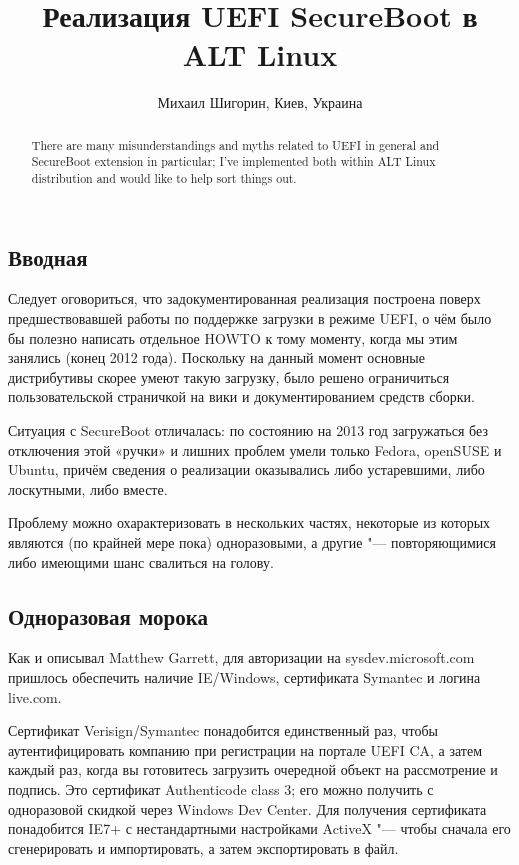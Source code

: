 \documentclass[10pt, a5paper]{article}
\begin{document}
\title{Реализация UEFI SecureBoot в ALT Linux}
\author{Михаил Шигорин, Киев, Украина}
\maketitle
\begin{abstract}
There are many misunderstandings and myths related to UEFI in general and SecureBoot extension in particular; I've implemented both within ALT Linux distribution and would like to help sort things out.
\end{abstract}
\subsection*{Вводная}

Следует оговориться, что задокументированная реализация построена поверх предшествовавшей работы по поддержке загрузки в режиме UEFI, о чём было бы полезно написать отдельное HOWTO к тому моменту, когда мы этим занялись (конец 2012 года).  Поскольку на данный момент основные дистрибутивы скорее умеют такую загрузку, было решено ограничиться пользовательской страничкой на вики и документированием средств сборки.

Ситуация с SecureBoot отличалась: по состоянию на 2013 год загружаться без отключения этой «ручки» и лишних проблем умели только Fedora, openSUSE и Ubuntu, причём сведения о реализации оказывались либо устаревшими, либо лоскутными, либо вместе.

Проблему можно охарактеризовать в нескольких частях, некоторые из которых являются (по крайней мере пока) одноразовыми, а другие "--- повторяющимися либо имеющими шанс свалиться на голову.

\subsection*{Одноразовая морока}

Как и описывал Matthew Garrett, для авторизации на sysdev.mi\-cro\-soft.com пришлось обеспечить наличие IE/Windows, сертификата Symantec и логина live.com.

Сертификат Verisign/Symantec понадобится единственный раз, чтобы аутентифицировать компанию при регистрации на портале UEFI CA, а затем каждый раз, когда вы готовитесь загрузить очередной объект на рассмотрение и подпись. Это сертификат Au\-then\-ti\-code class 3; его можно получить с одноразовой скидкой через Windows Dev Center. Для получения сертификата понадобится IE7+ с нестандартными настройками ActiveX "--- чтобы сначала его сгенерировать и импортировать, а затем экспортировать в файл.
\end{document}
